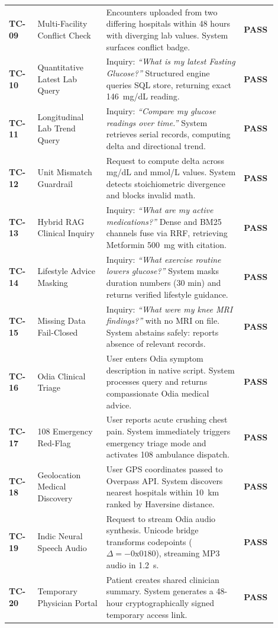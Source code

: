 \begin{longtable}{@{}p{0.10\linewidth} p{0.24\linewidth} p{0.48\linewidth} p{0.08\linewidth}@{}}
\textbf{TC-09} & Multi-Facility Conflict Check & Encounters uploaded from two differing hospitals within 48 hours with diverging lab values. System surfaces conflict badge. & \textbf{PASS} \\
\textbf{TC-10} & Quantitative Latest Lab Query & Inquiry: \textit{``What is my latest Fasting Glucose?''} Structured engine queries SQL store, returning exact 146~mg/dL reading. & \textbf{PASS} \\
\textbf{TC-11} & Longitudinal Lab Trend Query & Inquiry: \textit{``Compare my glucose readings over time.''} System retrieves serial records, computing delta and directional trend. & \textbf{PASS} \\
\textbf{TC-12} & Unit Mismatch Guardrail & Request to compute delta across mg/dL and mmol/L values. System detects stoichiometric divergence and blocks invalid math. & \textbf{PASS} \\
\textbf{TC-13} & Hybrid RAG Clinical Inquiry & Inquiry: \textit{``What are my active medications?''} Dense and BM25 channels fuse via RRF, retrieving Metformin 500~mg with citation. & \textbf{PASS} \\
\textbf{TC-14} & Lifestyle Advice Masking & Inquiry: \textit{``What exercise routine lowers glucose?''} System masks duration numbers (30 min) and returns verified lifestyle guidance. & \textbf{PASS} \\
\textbf{TC-15} & Missing Data Fail-Closed & Inquiry: \textit{``What were my knee MRI findings?''} with no MRI on file. System abstains safely: reports absence of relevant records. & \textbf{PASS} \\
\textbf{TC-16} & Odia Clinical Triage & User enters Odia symptom description in native script. System processes query and returns compassionate Odia medical advice. & \textbf{PASS} \\
\textbf{TC-17} & 108 Emergency Red-Flag & User reports acute crushing chest pain. System immediately triggers emergency triage mode and activates 108 ambulance dispatch. & \textbf{PASS} \\
\textbf{TC-18} & Geolocation Medical Discovery & User GPS coordinates passed to Overpass API. System discovers nearest hospitals within 10~km ranked by Haversine distance. & \textbf{PASS} \\
\textbf{TC-19} & Indic Neural Speech Audio & Request to stream Odia audio synthesis. Unicode bridge transforms codepoints ($\Delta = -0\text{x}0180$), streaming MP3 audio in 1.2~s. & \textbf{PASS} \\
\textbf{TC-20} & Temporary Physician Portal & Patient creates shared clinician summary. System generates a 48-hour cryptographically signed temporary access link. & \textbf{PASS} \\
\bottomrule
\end{longtable}
\normalsize


